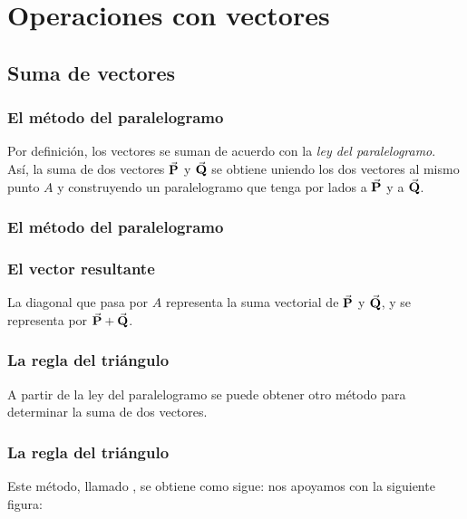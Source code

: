 \documentclass[12pt]{beamer}
\begin{document}
\section{Operaciones con vectores}
\subsection{Suma de vectores}

\begin{frame}
\frametitle{El método del paralelogramo}
Por definición, los vectores se suman de acuerdo con la \emph{ley del paralelogramo}.
\\
\bigskip
\pause
Así, la suma de dos vectores $\va{P}$ y $\va{Q}$ se obtiene uniendo los dos vectores al mismo punto $A$ y construyendo un paralelogramo que tenga por lados a $\va{P}$ y a $\va{Q}$.
\end{frame}
\begin{frame}
\frametitle{El método del paralelogramo}
\begin{figure}
    \centering
\end{figure}
\end{frame}
\begin{frame}
\frametitle{El vector resultante}
La diagonal que pasa por $A$ representa la suma vectorial de $\va{P}$ y $\va{Q}$, y se representa por $\va{P} + \va{Q}$.
\end{frame}
\begin{frame}
\frametitle{La regla del triángulo}
A partir de la ley del paralelogramo se puede obtener otro método para determinar
la suma de dos vectores.
\end{frame}
\begin{frame}
\frametitle{La regla del triángulo}    
Este método, llamado , se obtiene como sigue: \pause nos apoyamos con la siguiente figura:
\end{frame}
\end{document}

